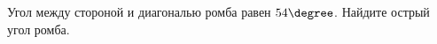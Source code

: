 \begin{ex}
	\begin{condition}
		Угол между стороной и диагональю ромба равен \( 54\degree \). Найдите острый угол ромба.
	\end{condition}
\end{ex}